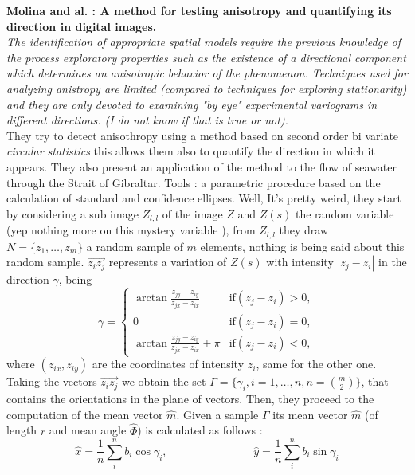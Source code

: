 \documentclass[12pt]{article}
\renewcommand{\hat}{\widehat}
\theoremstyle{Theorem}
\theoremstyle{definition}
\begin{document}
\textbf{Molina and al. : A method for testing anisotropy and quantifying its direction in digital images.}\\
 \textit{The identification of appropriate spatial models require the previous knowledge of the process exploratory properties such as the existence of a directional component which determines an anisotropic behavior of the phenomenon. Techniques used for analyzing anistropy are limited (compared to techniques for exploring stationarity) and they are only devoted to examining "by eye" experimental variograms in
different directions. (I do not know if that is true or not).} \\
They try to detect anisothropy using a method based on second order bi variate \textit{circular statistics} this allows them also to quantify the direction in which it appears. They also present an application of the method to  the flow of seawater through the Strait of Gibraltar. Tools : a parametric procedure based on the calculation of standard and confidence ellipses. Well, It's pretty weird, they start by considering a sub image $Z_{l,l}$ of the image $Z$ and $Z(s)$ the random variable (yep nothing more on this mystery variable ), from $Z_{l,l}$ they draw $N=\{z_{1}, \ldots, z_{m}\}$ a random sample of $m$ elements, nothing is being said about this random sample. $\overrightarrow{z_{i}z_{j}}$ represents a variation of $Z(s)$ with intensity $|z_{j} - z_{i}|$ in the direction $\gamma$, being 
\begin{equation*}
\gamma = \begin{cases} \arctan{\frac{z_{jy} - z_{iy}}{z_{jx} - z_{ix}}}& \text{if} (z_{j} - z_{i}) > 0, \\
0 & \text{if} (z_{j} - z_{i}) = 0, \\
 \arctan{\frac{z_{jy} - z_{iy}}{z_{jx} - z_{ix}}} + \pi & \text{if} (z_{j} - z_{i})  < 0, 
\end{cases}
\end{equation*}
where $(z_{ix}, z_{iy})$ are the coordinates of intensity $z_i$, same for the other one. Taking the vectors $\overrightarrow{z_{i}z_{j}}$ we obtain the set $\Gamma = \{\gamma_{i}, i = 1, \ldots, n, n = \binom{m}{2}\}$, that contains the orientations in the plane of vectors. Then, they proceed to the computation of the mean vector $\hat{m}$. Given a sample $\Gamma$ its mean vector $\hat{m}$ (of length $r$ and mean angle $\hat{\Phi}$) is calculated as follows : 
\begin{equation*}
\hat{x} = \frac{1}{n} \sum_{i}^{n} b_{i}\cos{\gamma_{i}}, \; \hspace{3cm}  \; \hat{y} = \frac{1}{n}\sum_{i}^{n}b_{i}\sin{\gamma_{i}}
\end{equation*}
\end{document}
